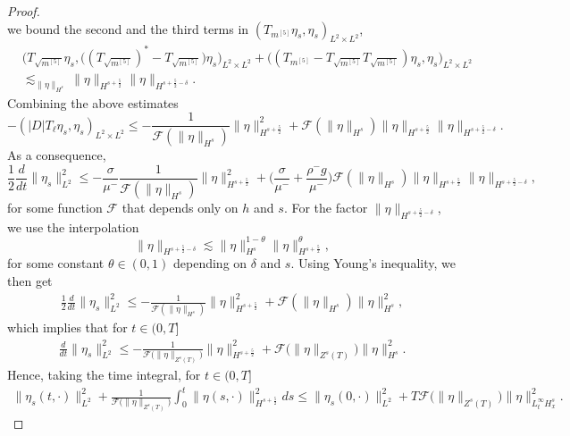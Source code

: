 \documentclass[12pt]{amsart}
\theoremstyle{definition}
\numberwithin{equation}{section}
\newcommand{\f}{\frac}
\begin{document}
\begin{proof}
\begin{equation*}
\end{equation*}
we bound the second and the third terms in $(T_{m^{[5]}} \eta_s, \eta_s)_{L^2 \times L^2}$,
\begin{align*}
    &\big(T_{\sqrt{m^{[5]}}} \eta_s, \big((T_{\sqrt{m^{[5]}}})^{*} -T_{\sqrt{m^{[5]}}}\big)\eta_s\big)_{L^2 \times L^2} + \big((T_{m^{[5]}}-T_{\sqrt{m^{[5]}}} T_{\sqrt{m^{[5]}}}) \eta_s, \eta_s\big)_{L^2 \times L^2}\\
    &\lesssim_{\|\eta\|_{H^s}}\|\eta\|_{H^{s+\f52}}\| \eta\|_{H^{s+\f52-\delta}}.
\end{align*}
Combining the above estimates 
\begin{equation*}
-(|D|T_\ell \eta_s, \eta_s)_{L^2 \times L^2} \leq - \frac{1}{\mathcal{F}(\|\eta\|_{H^s})} \|\eta\|^2_{H^{s+\f52}} +\mathcal{F}(\|\eta\|_{H^s})\|\eta\|_{H^{s+\f52}}\| \eta\|_{H^{s+\f52-\delta}}. 
\end{equation*}
As a consequence,
\begin{equation*}
 \f12\frac{d}{dt} \|\eta_s\|_{L^2}^2 \leq -\frac{\sigma}{\mu^{-}}\frac{1}{\mathcal{F}(\|\eta\|_{H^s})} \|\eta\|^2_{H^{s+\f52}} + \Big(\frac{\sigma}{\mu^{-}} + \frac{\rho^- g}{\mu^-}  \Big) \mathcal{F}(\|\eta\|_{H^s})\|\eta\|_{H^{s+\f52}}\| \eta\|_{H^{s+\f52-\delta}},
\end{equation*}
for some function $\mathcal{F}$ that depends only on $h$ and $s$.
For the factor $\| \eta\|_{H^{s+\f52-\delta}}$, we use the interpolation
\begin{equation*}
 \| \eta\|_{H^{s+\f52-\delta}} \lesssim \| \eta\|_{H^s}^{1-\theta}\| \eta\|_{H^{s+\f52}}^{\theta},
\end{equation*}
for some constant $\theta \in (0,1)$ depending on $\delta$ and $s$.
Using Young's inequality,  we then get
\begin{align*}
\f12\f{d}{dt}\|\eta_s\|^2_{L^2}
\leq-\f{1}{\mathcal{F}(\|\eta\|_{H^s})}\|\eta\|^2_{H^{s+\f52}}+\mathcal{F}(\|\eta\|_{H^s})\|\eta\|^2_{H^{s}},
\end{align*}
which implies that for $t\in(0,T]$
\begin{align*}
\f{d}{dt}\|\eta_s\|^2_{L^2}
\leq-\f{1}{\mathcal{F}\big(\|\eta\|_{Z^s(T)} \big)}\|\eta\|^2_{H^{s+\f52}}+\mathcal{F}\big(\|\eta\|_{Z^s(T)}\big)\|\eta\|^2_{H^{s}}.
\end{align*}
Hence, taking the time integral, for $t\in(0,T]$
\begin{align*}
\|\eta_s(t,\cdot)\|^2_{L^2}+\f{1}{\mathcal{F}\big(\|\eta\|_{Z^s(T)} \big)}\int_0^t\|\eta(s,\cdot)\|^2_{H^{s+\f52}}ds\leq \|\eta_s(0,\cdot)\|^2_{L^2}+T\mathcal{F}\big(\|\eta\|_{Z^s(T)}\big)\|\eta\|^2_{L^\infty_t H^{s}_x}.

\end{align*}
\end{proof}
\end{document}
